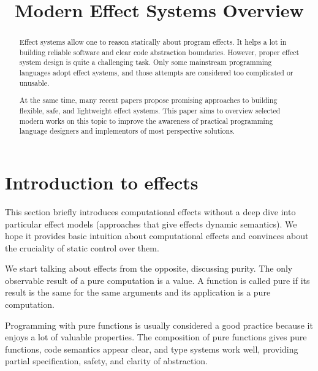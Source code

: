 \documentclass[conference]{IEEEtran}
\begin{document}
    \title{Modern Effect Systems Overview
    }




    \maketitle


    \begin{abstract}
        Effect systems allow one to reason statically about program effects.
        It helps a lot in building reliable software and clear code abstraction boundaries.
        However, proper effect system design is quite a challenging task.
        Only some mainstream programming languages adopt effect systems, and those attempts are considered too complicated or unusable.

        At the same time, many recent papers propose promising approaches to building flexible, safe, and lightweight effect systems.
        This paper aims to overview selected modern works on this topic to improve the awareness of practical programming language designers and implementors of most perspective solutions.
    \end{abstract}


    \section{Introduction to effects}

    This section briefly introduces computational effects without a deep dive into particular effect models (approaches that give effects dynamic semantics).
    We hope it provides basic intuition about computational effects and convinces about the cruciality of static control over them.

    We start talking about effects from the opposite, discussing purity.
    The only observable result of a pure computation is a value.
    A function is called pure if its result is the same for the same arguments and its application is a pure computation.

    Programming with pure functions is usually considered a good practice because it enjoys a lot of valuable properties.
    The composition of pure functions gives pure functions, code semantics appear clear, and type systems work well, providing partial specification, safety, and clarity of abstraction.
\end{document}
